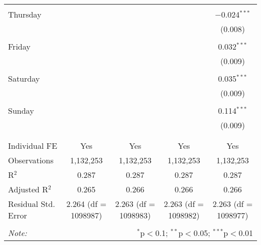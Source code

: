 \documentclass[
]{article}
\begin{document}
\begin{table}[!htbp]
{\begin{tabular}{@{\extracolsep{5pt}}lcccc}
  & & & & \\ 
 Thursday &  &  &  & $-$0.024$^{***}$ \\ 
  &  &  &  & (0.008) \\ 
  & & & & \\ 
 Friday &  &  &  & 0.032$^{***}$ \\ 
  &  &  &  & (0.009) \\ 
  & & & & \\ 
 Saturday &  &  &  & 0.035$^{***}$ \\ 
  &  &  &  & (0.009) \\ 
  & & & & \\ 
 Sunday &  &  &  & 0.114$^{***}$ \\ 
  &  &  &  & (0.009) \\ 
  & & & & \\ 
\hline \\[-1.8ex] 
Individual FE & Yes & Yes & Yes & Yes \\ 
Observations & 1,132,253 & 1,132,253 & 1,132,253 & 1,132,253 \\ 
R$^{2}$ & 0.287 & 0.287 & 0.287 & 0.287 \\ 
Adjusted R$^{2}$ & 0.265 & 0.266 & 0.266 & 0.266 \\ 
Residual Std. Error & 2.264 (df = 1098987) & 2.263 (df = 1098983) & 2.263 (df = 1098982) & 2.263 (df = 1098977) \\ 
\hline 
\hline \\[-1.8ex] 
\textit{Note:}  & \multicolumn{4}{r}{$^{*}$p$<$0.1; $^{**}$p$<$0.05; $^{***}$p$<$0.01} \\ 
\end{tabular}
} 
\end{table} 
\newpage
\end{document}
